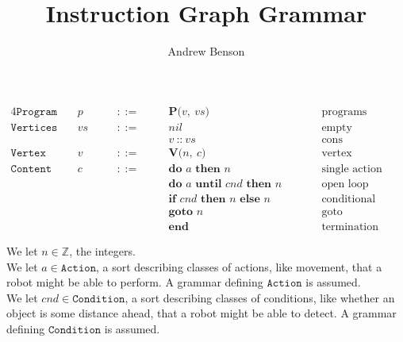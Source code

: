 \documentclass[12pt]{article}
\title{Instruction Graph Grammar}
\author{Andrew Benson}
\date{}
\newcommand{\sort}[1]{\mathtt{#1}}
\newcommand{\syn}[1]{\textbf{#1}}
\newcommand{\nterm}[1]{\mathit{#1}}
\newcommand{\prog}[2]{\syn{P(}#1,\ #2\syn{)}}
\newcommand{\cons}[2]{#1\ \syn{::}\ #2}
\newcommand{\ver}[2]{\syn{V(}#1,\ #2\syn{)}}
\newcommand{\doonce}[2]{\syn{do }#1\syn{ then }#2}
\newcommand{\dountil}[3]{\syn{do }#1\syn{ until }#2\syn{ then }#3}
\newcommand{\ifelse}[3]{\syn{if }#1\syn{ then }#2\syn{ else }#3}
\newcommand{\goto}[1]{\syn{goto }#1}
\newcommand{\progend}[0]{\syn{end}}
\begin{document}
\maketitle

\thispagestyle{simple}

\begin{alignat*}{4}
  \sort{Program}\quad
    &\nterm{p}\quad & &::=\quad &
      &\prog{\nterm{v}}{\nterm{vs}}\qquad & &\text{programs}\\
  \sort{Vertices}\quad
    &\nterm{vs}\quad & &::=\quad &
      &\nterm{nil}\qquad & &\text{empty}\\
  &&&&&\cons{\nterm{v}}{\nterm{vs}}\qquad & &\text{cons}\\
  \sort{Vertex}\quad
    &\nterm{v}\quad & &::=\quad &
      &\ver{\nterm{n}}{\nterm{c}}\qquad & &\text{vertex}\\
  \sort{Content}\quad
    &\nterm{c}\quad & &::=\quad &
      &\doonce{\nterm{a}}{\nterm{n}}\qquad & &\text{single action}\\
  &&&&&\dountil{\nterm{a}}{\nterm{cnd}}{\nterm{n}}\qquad & &\text{open loop action}\\
  &&&&&\ifelse{\nterm{cnd}}{\nterm{n}}{\nterm{n}}\qquad & & \text{conditional}\\
  &&&&&\goto{\nterm{n}}\qquad & &\text{goto}\\
  &&&&&\progend\qquad & &\text{termination}
\end{alignat*}

We let $\nterm{n} \in \mathbb{Z}$, the integers.\\

We let $\nterm{a} \in \sort{Action}$, a sort describing classes of actions,
like movement, that a robot might be able to perform. A grammar defining
$\sort{Action}$ is assumed.\\

We let $\nterm{cnd} \in \sort{Condition}$, a sort describing classes of
conditions, like whether an object is some distance ahead, that a robot might be
able to detect. A grammar defining $\sort{Condition}$ is assumed.\\
\end{document}
